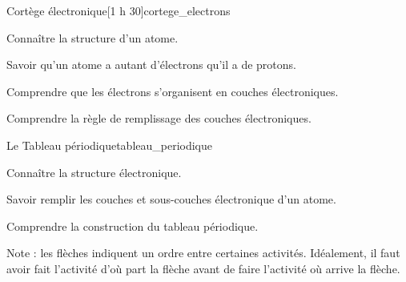 \begin{multicols}{2}    
  \begin{activite}{Cortège électronique}[1 h 30]{cortege_electrons}
    \begin{prerequis}
      \item Connaître la structure d'un atome.
      \item Savoir qu'un atome a autant d'électrons qu'il a de protons.
    \end{prerequis}
    \begin{objectifs}
      \item Comprendre que les électrons s'organisent en couches électroniques.
      \item Comprendre la règle de remplissage des couches électroniques.
    \end{objectifs}
  \end{activite}

  \begin{TP}{Le Tableau périodique}{tableau_periodique}
    \begin{prerequis}
      \item Connaître la structure électronique.
      \item Savoir remplir les couches et sous-couches électronique d'un atome.
    \end{prerequis}
    \begin{objectifs}
      \item Comprendre la construction du tableau périodique.
    \end{objectifs}
  \end{TP}
\end{multicols}

\vspace*{-2cm}

\vspace*{1.5cm}
Note : les flèches indiquent un ordre entre certaines activités.
Idéalement, il faut avoir fait l'activité d'où part la flèche avant de faire l'activité où arrive la flèche.


\newpage
\nomPrenomClasse
{}
\vspace*{12pt}

